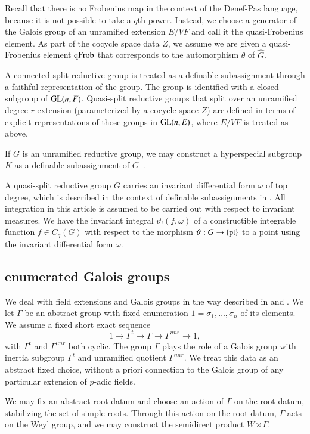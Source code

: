 Recall that there is no Frobenius map in the context of the Denef-Pas
language, because it is not possible to take a $q$th power.  Instead,
we choose a generator of the Galois group of an unramified extension
$E/VF$ and call it the quasi-Frobenius element.  As part of the
cocycle space data $Z$, we assume we are given a quasi-Frobenius
element ${\operatorname{qFrob}}$ that corresponds to the automorphism $\theta$ of
$\hat G$.

A connected split reductive group is treated as a definable
subassignment through a faithful representation of the group.  The
group is identified with a closed subgroup of ${\operatorname{GL}}(n,F)$.
Quasi-split reductive groups that split over an unramified degree $r$
extension (parameterized by a cocycle space $Z$) are defined in terms
of explicit representations of those groups in ${\operatorname{GL}}(n,E)$, where
$E/VF$ is treated as above.

If $G$ is an unramified reductive group, we may construct a
hyperspecial subgroup $K$ as a definable subassignment of
$G$~\cite{cluckers2011local}.

A quasi-split reductive group $G$ carries an invariant differential
form $\omega$ of top degree, which is described in the context of
definable subassignments in \cite{gordon}.  All integration in this
article is assumed to be carried out with respect to invariant
measures.  We have the invariant integral $\vartheta_!(f,\omega)$ of a
constructible integrable function $f\in C_q(G)$ with respect to the
morphism $\vartheta:G\to\{{\operatorname{pt}}\}$ to a point using the invariant
differential form $\omega$.

\subsection{enumerated Galois groups}\label{sec:galois}

We deal with field extensions and Galois groups in the way described
in \cite{gordon} and \cite{cluckers2011transfer}.  We let $\Gamma$ be
an abstract group with fixed enumeration $1=\sigma_1,\ldots,\sigma_n$
of its elements.  We assume a fixed short exact sequence
\[
1\to \Gamma^t\to\Gamma\to\Gamma^{unr}\to 1,
\]
with $\Gamma^t$ and $\Gamma^{unr}$ both cyclic.  The group $\Gamma$
plays the role of a Galois group with inertia subgroup $\Gamma^t$ and
unramified quotient $\Gamma^{unr}$.  We treat this data as an abstract
fixed choice, without a priori connection to the Galois group of any
particular extension of $p$-adic fields.

We may fix an abstract root datum and choose an action of $\Gamma$ on
the root datum, stabilizing the set of simple roots.  Through this
action on the root datum, $\Gamma$ acts on the Weyl group, and we may
construct the semidirect product $W\rtimes \Gamma$.

